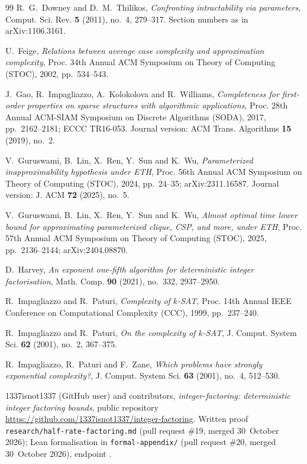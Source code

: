 \documentclass[10pt]{amsart}
\theoremstyle{plain}
\theoremstyle{definition}
\theoremstyle{remark}
\numberwithin{equation}{section}
\begin{document}
\begin{thebibliography}{99}
R.~G.~Downey and D.~M.~Thilikos, \emph{Confronting intractability via parameters}, Comput. Sci.
Rev. \textbf{5} (2011), no.~4, 279--317. Section numbers as in arXiv:1106.3161.

U.~Feige, \emph{Relations between average case complexity and approximation complexity}, Proc. 34th
Annual ACM Symposium on Theory of Computing (STOC), 2002, pp.~534--543.

J.~Gao, R.~Impagliazzo, A.~Kolokolova and R.~Williams, \emph{Completeness for first-order properties
on sparse structures with algorithmic applications}, Proc. 28th Annual ACM-SIAM Symposium on
Discrete Algorithms (SODA), 2017, pp.~2162--2181; ECCC TR16-053. Journal version: ACM Trans.
Algorithms \textbf{15} (2019), no.~2.

V.~Guruswami, B.~Lin, X.~Ren, Y.~Sun and K.~Wu, \emph{Parameterized inapproximability hypothesis
under {ETH}}, Proc. 56th Annual ACM Symposium on Theory of Computing (STOC), 2024, pp.~24--35;
arXiv:2311.16587. Journal version: J. ACM \textbf{72} (2025), no.~5.

V.~Guruswami, B.~Lin, X.~Ren, Y.~Sun and K.~Wu, \emph{Almost optimal time lower bound for
approximating parameterized clique, {CSP}, and more, under {ETH}}, Proc. 57th Annual ACM Symposium
on Theory of Computing (STOC), 2025, pp.~2136--2144; arXiv:2404.08870.

D.~Harvey, \emph{An exponent one-fifth algorithm for deterministic integer factorisation}, Math.
Comp. \textbf{90} (2021), no.~332, 2937--2950.

R.~Impagliazzo and R.~Paturi, \emph{Complexity of $k$-{SAT}}, Proc. 14th Annual IEEE Conference on
Computational Complexity (CCC), 1999, pp.~237--240.

R.~Impagliazzo and R.~Paturi, \emph{On the complexity of $k$-{SAT}}, J. Comput. System Sci.
\textbf{62} (2001), no.~2, 367--375.

R.~Impagliazzo, R.~Paturi and F.~Zane, \emph{Which problems have strongly exponential complexity?},
J. Comput. System Sci. \textbf{63} (2001), no.~4, 512--530.

1337isnot1337 (GitHub user) and contributors, \emph{integer-factoring: deterministic integer
factoring bounds}, public repository \url{https://github.com/1337isnot1337/integer-factoring}.
Written proof \texttt{research/half-rate-factoring.md} (pull request \#19, merged 30~October 2026);
Lean formalisation in \texttt{formal-appendix/} (pull request \#20, merged 30~October 2026),
endpoint .


\end{thebibliography}
\end{document}
